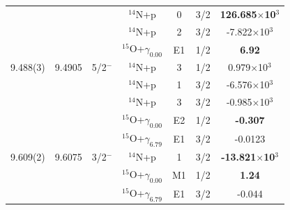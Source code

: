 \begin{table}[]
\begin{center}
\begin{threeparttable}
\begin{tabular}{c  c  c  c  c  c  c}
	&	&	&	$^{14}$N+p	&	0	&	3/2	&	\textbf{126.685$\times$10$^3$}	\\
	&	&	&	$^{14}$N+p	&	2	&	3/2	&	{-7.822$\times$10$^3$}\\
	&	&	&	$^{15}$O+$\gamma_{0.00}$	&	E1	&	1/2	&	\textbf{6.92}\\
9.488(3) & {9.4905}&	5/2$^-$	&	$^{14}$N+p	&	3	&	1/2	&	{0.979$\times$10$^3$}\\
	&	&	&	$^{14}$N+p	&	1	&	3/2	&	{-6.576$\times$10$^3$}\\
	&	&	&	$^{14}$N+p	&	3	&	3/2	&	{-0.985$\times$10$^3$}\\
	&	&	&	$^{15}$O+$\gamma_{0.00}$	&	E2	&	1/2	&	\textbf{-0.307}\\
	&	&	&	$^{15}$O+$\gamma_{6.79}$	&	E1	&	3/2	&	{-0.0123}\\
9.609(2) & {9.6075}&	3/2$^-$	&	$^{14}$N+p	&	1	&	3/2	&	\textbf{-13.821$\times$10$^3$}\\
	&	&	&	$^{15}$O+$\gamma_{0.00}$	&	M1	&	1/2	&	\textbf{1.24}\\
     &	&	&	$^{15}$O+$\gamma_{6.79}$	&	E1	&	3/2	&	{-0.044}\\

\end{tabular}
\end{threeparttable}
\end{center}
\end{table}
